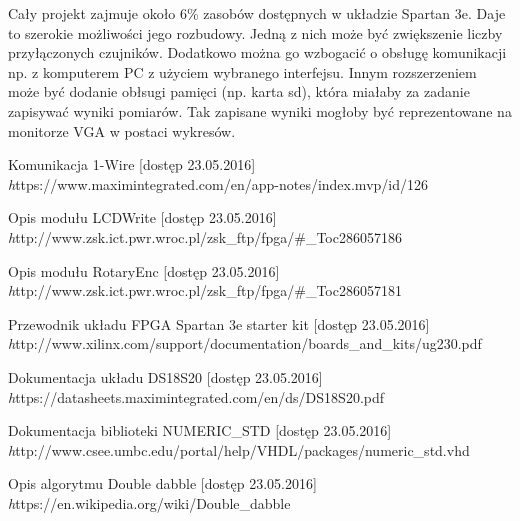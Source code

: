 \documentclass[a4paper]{article}
\begin{document}
Cały projekt zajmuje około 6\% zasobów dostępnych w układzie Spartan 3e. Daje to szerokie możliwości jego rozbudowy. Jedną z nich może być zwiększenie liczby przyłączonych czujników. Dodatkowo można go wzbogacić o obsługę komunikacji np. z komputerem PC z użyciem wybranego interfejsu. Innym rozszerzeniem może być dodanie obłsugi pamięci (np. karta sd), która miałaby za zadanie zapisywać wyniki pomiarów. Tak zapisane wyniki mogłoby być reprezentowane na monitorze VGA w postaci wykresów.

\begin{thebibliography}{9}
Komunikacja 1-Wire [dostęp 23.05.2016] \\
\emph  	https://www.maximintegrated.com/en/app-notes/index.mvp/id/126

Opis modułu LCDWrite [dostęp 23.05.2016] \\
\emph http://www.zsk.ict.pwr.wroc.pl/zsk\_ftp/fpga/\#\_Toc286057186

Opis modułu RotaryEnc [dostęp 23.05.2016] \\
\emph http://www.zsk.ict.pwr.wroc.pl/zsk\_ftp/fpga/\#\_Toc286057181

Przewodnik układu FPGA Spartan 3e starter kit [dostęp 23.05.2016] \\
\emph http://www.xilinx.com/support/documentation/boards\_and\_kits/ug230.pdf

Dokumentacja układu DS18S20 [dostęp 23.05.2016] \\
\emph https://datasheets.maximintegrated.com/en/ds/DS18S20.pdf

Dokumentacja biblioteki NUMERIC\_STD [dostęp 23.05.2016] \\
\emph http://www.csee.umbc.edu/portal/help/VHDL/packages/numeric\_std.vhd

Opis algorytmu Double dabble [dostęp 23.05.2016] \\
\emph https://en.wikipedia.org/wiki/Double\_dabble

\end{thebibliography}
\end{document}
